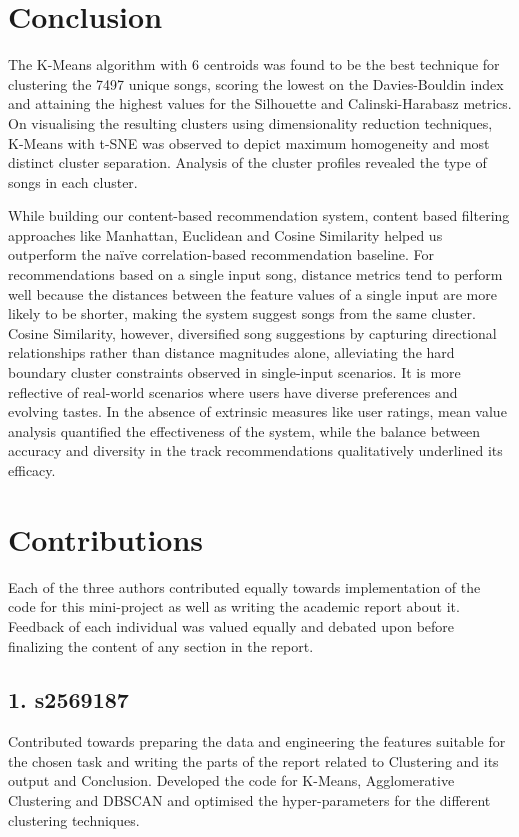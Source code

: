 \documentclass{article}
\begin{document}
\section{Conclusion}

The K-Means algorithm with 6 centroids was found to be the best technique for clustering the 7497 unique songs, scoring the lowest on the Davies-Bouldin index and attaining the highest values for the Silhouette and Calinski-Harabasz metrics. On visualising the resulting clusters using dimensionality reduction techniques, K-Means with t-SNE was observed to depict maximum homogeneity and most distinct cluster separation. Analysis of the cluster profiles revealed the type of songs in each cluster.

While building our content-based recommendation system, content based filtering approaches like Manhattan, Euclidean and Cosine Similarity helped us outperform the naïve correlation-based recommendation baseline. For recommendations based on a single input song, distance metrics tend to perform well because the distances between the feature values of a single input are more likely to be shorter, making the system suggest songs from the same cluster. Cosine Similarity, however, diversified song suggestions by capturing directional relationships rather than distance magnitudes alone, alleviating the hard boundary cluster constraints observed in single-input scenarios. It is more reflective of real-world scenarios where users have diverse preferences and evolving tastes. In the absence of extrinsic measures like user ratings, mean value analysis quantified the effectiveness of the system, while the balance between accuracy and diversity in the track recommendations qualitatively underlined its efficacy. 



\clearpage

\section*{Contributions} 
Each of the three authors contributed equally towards implementation of the code for this mini-project as well as writing the academic report about it. Feedback of each individual was valued equally and debated upon before finalizing the content of any section in the report.
\subsection*{1. s2569187}
Contributed towards preparing the data and engineering the features suitable for the chosen task and writing the parts of the report related to Clustering and its output and Conclusion. Developed the code for K-Means, Agglomerative Clustering and DBSCAN and optimised the hyper-parameters for the different clustering techniques. 
\end{document}
